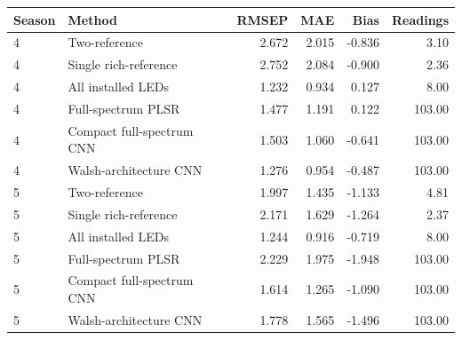 \begin{tabular}{llrrrr}
\toprule
Season & Method & RMSEP & MAE & Bias & Readings \\
\midrule
4 & Two-reference & 2.672 & 2.015 & -0.836 & 3.10 \\
4 & Single rich-reference & 2.752 & 2.084 & -0.900 & 2.36 \\
4 & All installed LEDs & 1.232 & 0.934 & 0.127 & 8.00 \\
4 & Full-spectrum PLSR & 1.477 & 1.191 & 0.122 & 103.00 \\
4 & Compact full-spectrum CNN & 1.503 & 1.060 & -0.641 & 103.00 \\
4 & Walsh-architecture CNN & 1.276 & 0.954 & -0.487 & 103.00 \\
5 & Two-reference & 1.997 & 1.435 & -1.133 & 4.81 \\
5 & Single rich-reference & 2.171 & 1.629 & -1.264 & 2.37 \\
5 & All installed LEDs & 1.244 & 0.916 & -0.719 & 8.00 \\
5 & Full-spectrum PLSR & 2.229 & 1.975 & -1.948 & 103.00 \\
5 & Compact full-spectrum CNN & 1.614 & 1.265 & -1.090 & 103.00 \\
5 & Walsh-architecture CNN & 1.778 & 1.565 & -1.496 & 103.00 \\
\bottomrule
\end{tabular}